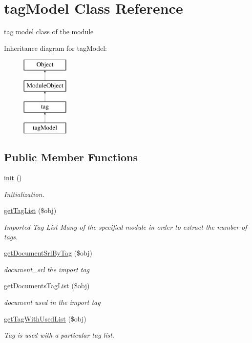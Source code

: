 \hypertarget{classtagModel}{}\section{tag\+Model Class Reference}
\label{classtagModel}


tag model class of the module  


Inheritance diagram for tag\+Model\+:\begin{figure}[H]
\begin{center}
\leavevmode
\includegraphics[height=4.000000cm]{classtagModel}
\end{center}
\end{figure}
\subsection*{Public Member Functions}
\begin{DoxyCompactItemize}
\item 
\hyperlink{classtagModel_ad408b1b4892a6637b1ac70250d37b8a6}{init} ()
\begin{DoxyCompactList}\small\item\em Initialization. \end{DoxyCompactList}\item 
\hyperlink{classtagModel_adb9465eef985504d91a2b8673e4339f3}{get\+Tag\+List} (\$obj)
\begin{DoxyCompactList}\small\item\em Imported Tag List Many of the specified module in order to extract the number of tags. \end{DoxyCompactList}\item 
\hyperlink{classtagModel_ae4ce7b3bc2314007c44c65375d089c13}{get\+Document\+Srl\+By\+Tag} (\$obj)
\begin{DoxyCompactList}\small\item\em document\+\_\+srl the import tag \end{DoxyCompactList}\item 
\hyperlink{classtagModel_a174355a0ae69966436ad4a30f2b134e1}{get\+Documents\+Tag\+List} (\$obj)
\begin{DoxyCompactList}\small\item\em document used in the import tag \end{DoxyCompactList}\item 
\hyperlink{classtagModel_aa585bee0000c45b8f5a9fbf253926c59}{get\+Tag\+With\+Used\+List} (\$obj)
\begin{DoxyCompactList}\small\item\em Tag is used with a particular tag list. \end{DoxyCompactList}\end{DoxyCompactItemize}
